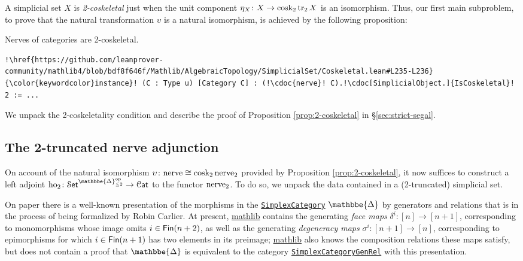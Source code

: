\documentclass[a4paper,UKenglish,cleveref, autoref, thm-restate]{lipics-v2021}
\newcommand{\op}{\textup{op}}
\newcommand{\cosk}{\textup{cosk}}
\newcommand{\tr}{\textup{tr}}
\newcommand{\ho}{\textup{ho}}
\newcommand{\nerve}{\textup{nerve}}
\newcommand{\cat}[1]{\textup{\textsf{#1}}}%
\newcommand{\1}{\mathbbe{1}}
\newcommand{\2}{\mathbbe{2}}
\newcommand{\3}{\mathbbe{3}}
\newcommand{\DDelta}{\mathbbe{\Delta}}
\newcommand{\Fin}{\cat{Fin}}
\newcommand{\Cat}{\mathcal{C}\cat{at}}
\newcommand{\Set}{\mathcal{S}\cat{et}}
\newcommand{\libmathlib}{\href{https://github.com/leanprover-community/mathlib}{\textsf{mathlib}}}
\newcommand{\ldoc}[2][]{\href{https://leanprover-community.github.io/mathlib4_docs/find/?pattern=#1#2\#doc}{\texttt{#2}}}
\newcommand{\cdoc}[2][]{\href{https://leanprover-community.github.io/mathlib4_docs/find/?pattern=CategoryTheory.#1#2\#doc}{\texttt{#2}}}
\begin{document}
A simplicial set $X$ is \emph{2-coskeletal} just when the unit component $\eta_X \colon X \to \cosk_2\,\tr_2\,X$ is an isomorphism. Thus, our first main subproblem, to prove that the natural transformation $\upsilon$ is a natural isomorphism, is achieved by the following proposition:

\begin{proposition}[{\ldoc[SSet.StrictSegal.]{isCoskeletal}}]\label{prop:2-coskeletal}
Nerves of categories are 2-coskeletal.
\end{proposition}
\begin{lstlisting}
!\href{https://github.com/leanprover-community/mathlib4/blob/bdf8f646f/Mathlib/AlgebraicTopology/SimplicialSet/Coskeletal.lean#L235-L236}{\color{keywordcolor}instance}! (C : Type u) [Category C] : (!\cdoc{nerve}! C).!\cdoc[SimplicialObject.]{IsCoskeletal}! 2 := ...
\end{lstlisting}

We unpack the 2-coskeletality condition and describe the proof of Proposition \ref{prop:2-coskeletal} in \S\ref{sec:strict-segal}.

\subsection{The 2-truncated nerve adjunction}\label{sec:ho2}

On account of the natural isomorphism $\upsilon \colon \nerve \cong \cosk_2\,\nerve_2$ provided by Proposition \ref{prop:2-coskeletal}, it now suffices to construct a left adjoint $\ho_2 \colon \Set^{\DDelta_{\leq 2}^\op} \to \Cat$ to the functor $\nerve_2$. To do so, we unpack the data contained in a (2-truncated) simplicial set.

On paper there is a well-known presentation of the morphisms in the \ldoc{SimplexCategory} $\DDelta$ by generators and relations \cite[\S I.1]{goerss-jardine} that is in the process of being formalized by Robin Carlier. At present, \libmathlib{} contains the generating \emph{face maps} $\delta^i \colon [n] \to [n + 1]$, corresponding to monomorphisms whose image omits $i \in \Fin(n + 2)$, as well as the generating \emph{degeneracy maps} $\sigma^i \colon [n + 1] \to [n]$, corresponding to epimorphisms for which $i \in \Fin(n+1)$ has two elements in its preimage; \libmathlib{} also knows the composition relations these maps satisfy, but does not contain a proof that $\DDelta$ is equivalent to the category \ldoc{SimplexCategoryGenRel} with this presentation.
\end{document}

